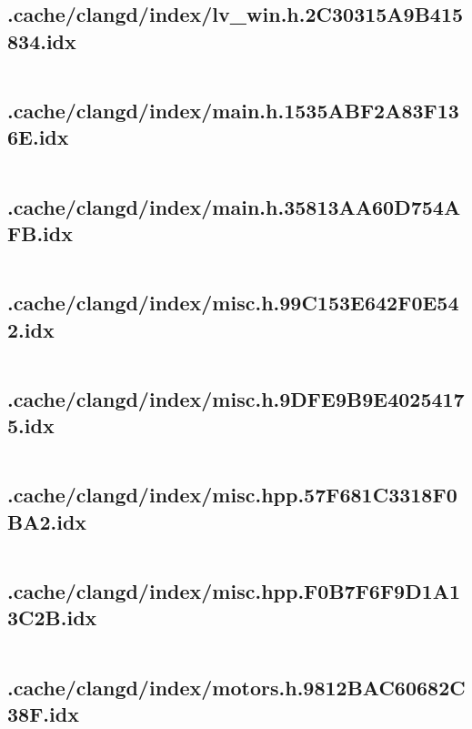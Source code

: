 \subsection{.cache/clangd/index/lv_win.h.2C30315A9B415834.idx}
\inputminted[linenos,tabsize=2,breaklines, breakanywhere]{c}{lv_win.h.2C30315A9B415834.idx}
\pagebreak

\subsection{.cache/clangd/index/main.h.1535ABF2A83F136E.idx}
\inputminted[linenos,tabsize=2,breaklines, breakanywhere]{c}{main.h.1535ABF2A83F136E.idx}
\pagebreak

\subsection{.cache/clangd/index/main.h.35813AA60D754AFB.idx}
\inputminted[linenos,tabsize=2,breaklines, breakanywhere]{c}{main.h.35813AA60D754AFB.idx}
\pagebreak

\subsection{.cache/clangd/index/misc.h.99C153E642F0E542.idx}
\inputminted[linenos,tabsize=2,breaklines, breakanywhere]{c}{misc.h.99C153E642F0E542.idx}
\pagebreak

\subsection{.cache/clangd/index/misc.h.9DFE9B9E40254175.idx}
\inputminted[linenos,tabsize=2,breaklines, breakanywhere]{c}{misc.h.9DFE9B9E40254175.idx}
\pagebreak

\subsection{.cache/clangd/index/misc.hpp.57F681C3318F0BA2.idx}
\inputminted[linenos,tabsize=2,breaklines, breakanywhere]{c}{misc.hpp.57F681C3318F0BA2.idx}
\pagebreak

\subsection{.cache/clangd/index/misc.hpp.F0B7F6F9D1A13C2B.idx}
\inputminted[linenos,tabsize=2,breaklines, breakanywhere]{c}{misc.hpp.F0B7F6F9D1A13C2B.idx}
\pagebreak

\subsection{.cache/clangd/index/motors.h.9812BAC60682C38F.idx}
\inputminted[linenos,tabsize=2,breaklines, breakanywhere]{c}{motors.h.9812BAC60682C38F.idx}
\pagebreak

